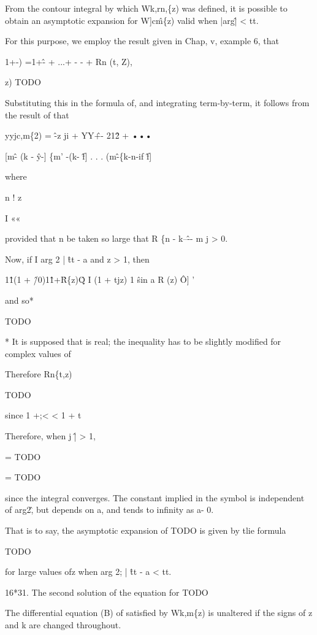 From the contour integral by which Wk,rn,\{z) was defined, it is
possible to obtain an asymptotic expansion for W]c\^m\{z) valid when
|arg\^| < tt.

For this purpose, we employ the result given in Chap, v, example 6,
that

1+-) =1+\^- + ...+ - - + Rn (t, Z),

z) TODO

Substituting this in the formula of, and integrating
term-by-term, it follows from the result of that

yyjc,m\{2) = \^ -z ji + YY\^ +- 21\^2 + •••

[m\^ - (k - \^y-] \{m' -(k- \^f] . . . (m\^ -\{k-n-if \^f]

where

n ! z

I ««

provided that n be taken so large that R \{n - k--\^-- m j > 0.

Now, if I arg 2 | \^ tt - a and z > 1, then

1\^1(1 + \^/0)1\^1+\^ R\{z)\^Q I (1 + tjz) 1 \^ sin a R (z) \^ O] '

and so*

TODO

* It is supposed that is real; the inequality has to be slightly
modified for complex values of

%
%

Therefore Rn\{t,z)

TODO

since 1 +;< < 1 + t

Therefore, when j \^ | > 1,

= TODO

= TODO

since the integral converges. The constant implied in the symbol is
independent of arg2\^, but depends on a, and tends to infinity as a-
0.

That is to say, the asymptotic expansion of TODO is given by tlie
formula

TODO

for large values ofz when arg 2; | \^ tt - a < tt.

16*31. The second solution of the equation for TODO

The differential equation (B) of satisfied by Wk,m\{z) is
unaltered if the signs of z and k are changed throughout.

